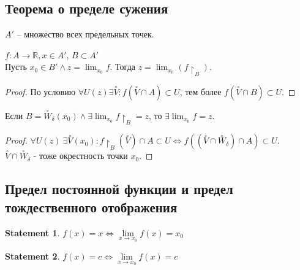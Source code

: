 \documentclass[11pt]{book}
\newcommand{\R}{\mathbb{R}}
\theoremstyle{definition}
\theoremstyle{plain}
\theoremstyle{plain}
\newtheorem*{st}{Statement}
\theoremstyle{definition}
\theoremstyle{remark}
\begin{document}
\subsection{Теорема о пределе сужения}\label{ques_16}
\begin{defn}
    $A'$ -- множество всех предельных точек.
\end{defn}
\begin{thm}
    $f: A \to \R, x \in A'$, $B \subset A'$\\
    Пусть $x_0 \in B' \wedge z = \lim_{x_0} f$. Тогда $z = \lim_{x_0} (f\!\upharpoonright_B)$.
\end{thm}
\begin{proof}
    По условию $\forall U(z) \exists \stackrel \circ V: f(\stackrel \circ V \cap A) \subset U $, тем более $f(\stackrel \circ V \cap B) \subset U$.
\end{proof}
\begin{thm}
    Если $B=\stackrel \circ W_{\delta }(x_0) \wedge \exists \lim_{x_0} f \!\upharpoonright_B = z$, то $\exists \lim_{x_0} f = z$.
\end{thm}
\begin{proof}
    $\forall U(z) ~\exists \stackrel \circ V(x_0): f\!\upharpoonright_B(\stackrel \circ V) \cap A \subset U \Leftrightarrow f((\stackrel \circ V \cap \stackrel \circ W_{\delta } ) \cap A ) \subset U$.\\
    $\stackrel \circ V \cap \stackrel \circ W_{\delta }$ - тоже окрестность точки $x_0$.
\end{proof}
\subsection{Предел постоянной функции и предел тождественного отображения}\label{ques_17}
\begin{st}
    $f(x) = x \Longleftrightarrow \lim\limits_{x \to x_0} f(x) = x_0$
\end{st}
\begin{st}
    $f(x) = c \Longleftrightarrow \lim\limits_{x \to x_0} f(x) = c$
\end{st}
\end{document}
